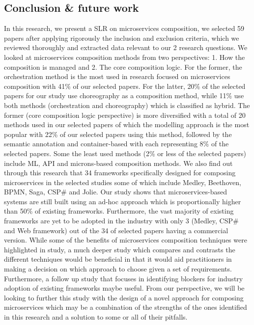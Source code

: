 \documentclass{article}
\begin{document}
\begin{multicols}{2}
\section{Conclusion \& future work}

In this research, we present a SLR on microservices composition, we selected 59 papers after applying rigorously the inclusion and exclusion criteria, which we reviewed thoroughly and extracted data relevant to our 2 research questions. We looked at microservices composition methods from two perspectives: 1. How the composition is managed and 2. The core composition logic. For the former, the orchestration method is the most used in research focused on microservices composition with 41\% of our selected papers. For the latter, 20\% of the selected papers for our study use choreography as a composition method, while 11\% use both methods (orchestration and choreography) which is classified as hybrid. The former (core composition logic perspective) is more diversified with a total of 20 methods used in our selected papers of which the modelling approach is the most popular with 22\% of our selected papers using this method, followed by the semantic annotation and container-based with each representing 8\% of the selected papers. Some the least used methods (2\% or less of the selected papers) include ML, API and microns-based composition methods. We also find out through this research that 34 frameworks specifically designed for composing microservices in the selected studies some of which include Medley, Beethoven, BPMN, Saga, CSP\# and Jolie. Our study shows that microservices-based systems are still built using an ad-hoc approach which is proportionally higher than 50\% of existing frameworks. Furthermore, the vast majority of existing frameworks are yet to be adopted in the industry with only 3 (Medley, CSP\# and Web framework) out of the 34 of selected papers having a commercial version.
While some of the benefits of microservices composition techniques were highlighted in study, a much deeper study which compares and contrasts the different techniques would be beneficial in that it would aid practitioners in making a decision on which approach to choose given a set of requirements. Furthermore, a follow up study that focuses in identifying blockers for industry adoption of existing frameworks maybe useful. From our perspective, we will be looking to further this study with the design of a novel approach for composing microservices which may be a combination of the strengths of the ones identified in this research and a solution to some or all of their pitfalls.

\end{multicols}
\pagebreak 
\end{document}
